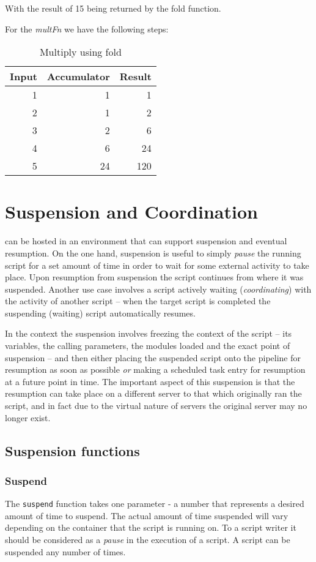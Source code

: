 With the result of 15 being returned by the fold function.

For the \emph{multFn} we have the following steps:

\begin{table}[!h]
\centering
\begin{tabular} { | r | r | r  | }
\hline
Input  & Accumulator & Result   \\
\hline
1 & 1 & 1 \\
2 & 1 & 2 \\
3 & 2 & 6 \\
4 & 6 & 24 \\
5 & 24 & 120 \\
\hline
\end{tabular}
\caption{Multiply using fold}
\end{table}

\chapter{Suspension and Coordination}
\Reflex can be hosted in an environment that can support suspension and eventual resumption. On the one hand, suspension is useful to simply \emph{pause} the running script for a set amount of time in order to wait for some external activity to take place. Upon resumption from suspension the script continues from where it was suspended. Another use case involves a script actively waiting (\emph{coordinating}) with the activity of another script -- when the target script is completed the suspending (waiting) script automatically resumes.


In the \Rapture context the suspension involves freezing the context of the script -- its variables, the calling parameters, the modules loaded and the exact point of suspension -- and then either placing the suspended script onto the \Rapture pipeline for resumption as soon as possible \emph{or} making a scheduled task entry for resumption at a future point in time. The important aspect of this suspension is that the resumption can take place on a different \Rapture server to that which originally ran the script, and in fact due to the virtual nature of \Rapture servers the original server may no longer exist.

\section{Suspension functions}
\subsection{Suspend}
The \verb+suspend+ function takes one parameter - a number that represents a desired amount of time to suspend. The actual amount of time suspended will vary depending on the container that the script is running on. To a script writer it should be considered as a \emph{pause} in the execution of a script. A script can be suspended any number of times.

